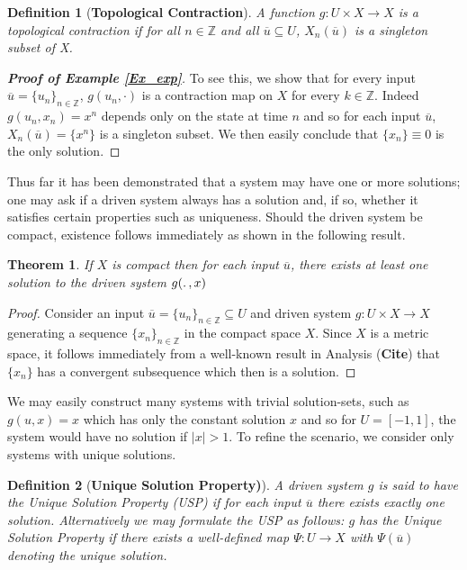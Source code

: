 \documentclass[12 pt]{article}
\newtheorem{Definition}{Definition}[]
\newtheorem{Theorem}{Theorem}[]
\begin{document}
\begin{Definition}
  [\bf Topological Contraction] \label{Dfn_TopContr}
  A function $g:U\times{X}\to{X}$ is a topological contraction if for all $n\in\mathbb{Z}$ and all $\overline{u}\subseteq{U}$, $X_n(\overline{u})$ is a singleton subset of X.  
\end{Definition}

\begin{proof}
  [\bf Proof of Example \ref{Ex_exp}] 
  To see this, we show that for every input $\overline{u}=\{u_n\}_{n\in\mathbb{Z}}$, $g(u_n,\cdot)$ is a contraction map on $X$ for every $k\in\mathbb{Z}$. 
  Indeed $g(u_n,x_n)=x^n$ depends only on the state at time $n$ and so for each input $\overline{u}$, $X_n(\overline{u})=\{x^n\}$ is a singleton subset.
  We then easily conclude that $\{x_n\}\equiv0$ is the only solution. 
\end{proof}

Thus far it has been demonstrated that a system may have one or more solutions; one may ask if a driven system always has a solution and, if so, whether it satisfies certain properties such as uniqueness. 
Should the driven system be compact, existence follows immediately as shown in the following result.

\begin{Theorem} \label{Thm_CompactExistence}
  If $X$ is compact then for each input $\overline{u}$, there exists at least one solution to the driven system $g(\ldotp, x)$
\end{Theorem}
\begin{proof}
  Consider an input $\overline{u}={\{u_n\}}_{n\in\mathbb{Z}}\subseteq{U}$ and driven system $g:U\times{X}\to{X}$  generating a sequence ${\{x_n\}}_{n\in\mathbb{Z}}$ in the compact space $X$. 
  Since $X$ is a metric space, it follows immediately from a well-known result in Analysis (\textbf{Cite}) that $\{x_n\}$ has a convergent subsequence which then is a solution. 
\end{proof}

We may easily construct many systems with trivial solution-sets, such as $g(u,x)=x$ which has only the constant solution $x$ and so for $U=[-1,1]$, the system would have no solution if $|x|>1$. To refine the scenario, we consider only systems with unique solutions. 

\begin{Definition}
  [\bf Unique Solution Property)] \label{Dfn_usp}
  A driven system $g$ is said to have the Unique Solution Property (USP) if for each input $\overline{u}$ there exists exactly one solution. 
  Alternatively we may formulate the USP as follows: $g$ has the Unique Solution Property if there exists a well-defined map $\Psi:{U}\to{X}$ with $\Psi({\overline{u}})$ denoting the unique solution.
\end{Definition}
\end{document}
